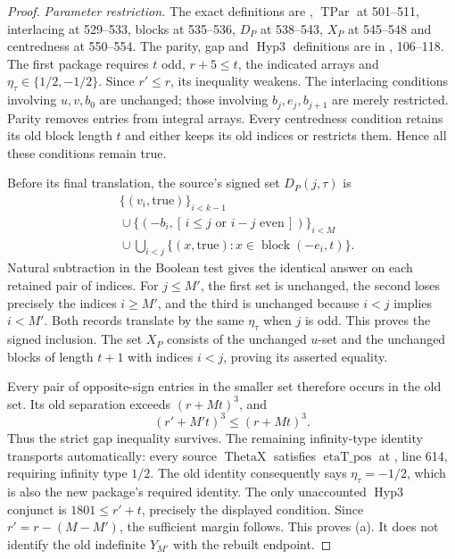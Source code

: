 \begin{proof}
\textit{Parameter restriction.}
The exact definitions are
,
$\operatorname{TPar}$ at 501--511, interlacing at 529--533, blocks at 535--536,
$D_P$ at 538--543, $X_P$ at 545--548 and centredness at 550--554.
The parity, gap and $\operatorname{Hyp3}$ definitions are in
,
106--118.
The first package requires $t$ odd, $r+5\le t$, the indicated arrays and
$\eta_\tau\in\{1/2,-1/2\}$. Since $r'\le r$, its inequality weakens.
The interlacing conditions involving $u,v,b_0$ are unchanged; those involving
$b_j,e_j,b_{j+1}$ are merely restricted. Parity removes entries from integral
arrays. Every centredness condition retains its old block length $t$ and
either keeps its old indices or restricts them. Hence all these conditions
remain true.

Before its final translation, the source's signed set $D_P(j,\tau)$ is
\[
 \begin{aligned}
 &\{(v_i,\mathrm{true})\}_{i<k-1}\\
 &{}\cup\{(-b_i,[\,i\le j\text{ or }i-j\text{ even}\,])\}_{i<M}\\
 &{}\cup\bigcup_{i<j}\{(x,\mathrm{true}):x\in\operatorname{block}(-e_i,t)\}.
 \end{aligned}
\]
Natural subtraction in the Boolean test gives the identical answer on
each retained pair of indices. For $j\le M'$, the first set is unchanged,
the second loses precisely the indices $i\ge M'$, and the third is unchanged
because $i<j$ implies $i<M'$. Both records translate by the same $\eta_\tau$
when $j$ is odd. This proves the signed inclusion.
The set $X_P$ consists of the unchanged $u$-set and the unchanged blocks
of length $t+1$ with indices $i<j$, proving its asserted equality.

Every pair of opposite-sign entries in the smaller set therefore occurs in
the old set. Its old separation exceeds $(r+Mt)^3$, and
\[
 (r'+M't)^3\le(r+Mt)^3.
\]
Thus the strict gap inequality survives.
The remaining infinity-type identity transports automatically:
every source $\operatorname{ThetaX}$ satisfies $\operatorname{etaT\_pos}$
at , line 614, requiring infinity type $1/2$.
The old identity consequently says $\eta_\tau=-1/2$, which is also the
new package's required identity.
The only unaccounted $\operatorname{Hyp3}$ conjunct is
$1801\le r'+t$, precisely the displayed condition.
Since $r'=r-(M-M')$, the sufficient margin follows. This proves (a).
It does not identify the old indefinite $Y_{M'}$ with the rebuilt endpoint.


\end{proof}
